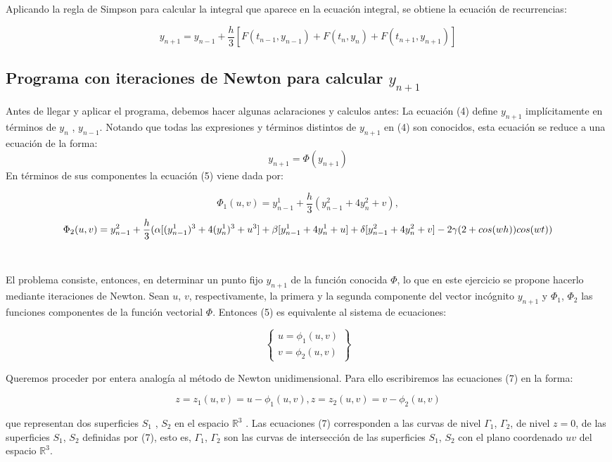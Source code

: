 \documentclass[letter, 10pt]{article}
\begin{document}
Aplicando la regla de Simpson para calcular la integral que aparece en
la ecuación integral, se obtiene la ecuación de recurrencias:

$$
y_{n+1} = y_{n-1} + \frac{h}{3} [F (t_{n-1} , y_{n-1} ) + F (t_n , y_n ) + F
(t_{n+1} , y_{n+1} )]
$$

\subsection{Programa con iteraciones de Newton para calcular $y_{n+1}$}
Antes de llegar y aplicar el programa, debemos hacer algunas aclaraciones y calculos antes:
La ecuación (4) define $y_{n+1}$ implícitamente en términos de $y_n$ ,
$y_{n-1}$. Notando que todas las expresiones y términos distintos de $y_{n+1}$
en (4) son conocidos, esta ecuación se reduce a una ecuación de la forma:
$$
y_{n+1}= \Phi(y_{n+1})
$$
En términos de sus componentes la ecuación (5) viene dada por:

$$
\Phi_1(u,v) = y_{n-1}^1+\frac{h}{3}(y_{n-1}^2+4y_{n}^2+v),
$$
$$
 \Phi_2(u,v) = y_{n-1}^2+\frac{h}{3}(\alpha [(y_{n-1}^1)^3+4(y_{n}^1)^3+u^3]+ \beta[y_{n-1}^1+4y_{n}^1+u]+\\ \delta[y_{n-1}^2+4y_{n}^2+v]-2 \gamma(2+cos(wh))cos(wt))
$$
\\\\
El problema consiste, entonces, en determinar un punto fijo $y_{n+1}$ de la función conocida $\Phi$, lo que en este ejercicio se propone hacerlo mediante iteraciones de Newton. Sean $u$, $v$, respectivamente, la primera y la segunda componente del vector incógnito $y_{n+1}$ y $\Phi_1$, $\Phi_2$ las funciones componentes de la función vectorial $\Phi$. Entonces (5) es equivalente al sistema de ecuaciones:

$$
\begin{Bmatrix} u=\phi_1(u,v) \\v=\phi_2(u,v) \end{Bmatrix}
$$

Queremos proceder por entera analogía al método de Newton unidimensional. Para ello escribiremos las ecuaciones (7) en la forma:

$$
z=z_1(u,v)=u- \phi_1(u,v),        z=z_2(u,v)=v- \phi_2(u,v)
$$


que representan dos superficies $S_1$ , $S_2$ en el espacio $\mathbb{R}^3$ . Las ecuaciones (7) corresponden a las curvas de nivel $\Gamma_1$, $\Gamma_2$, de nivel $z = 0$, de las superficies $S_1$, $S_2$ definidas por (7), esto es, $\Gamma_1$, $\Gamma_2$ son las curvas de intersección de las superficies $S_1$, $S_2$ con el plano coordenado $uv$ del espacio $\mathbb{R}^3$.
\end{document}
